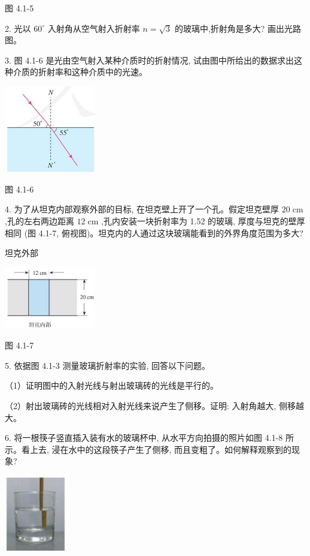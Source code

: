 \documentclass[10pt]{article}
\begin{document}
图 4.1-5

2. 光以 \({60}^{ \circ }\) 入射角从空气射入折射率 \(n = \sqrt{3}\) 的玻璃中,折射角是多大? 画出光路图。

3. 图 4.1-6 是光由空气射入某种介质时的折射情况, 试由图中所给出的数据求出这种介质的折射率和这种介质中的光速。

\begin{center}
\includegraphics[max width=0.3\textwidth]{images/01910e4c-ebb8-7d2c-8f2f-2375bc1d2d12_94_456472.jpg}
\end{center}

图 4.1-6

4. 为了从坦克内部观察外部的目标, 在坦克壁上开了一个孔。假定坦克壁厚 \({20}\mathrm{\;{cm}}\) ,孔的左右两边距离 \({12}\mathrm{\;{cm}}\) ,孔内安装一块折射率为 1.52 的玻璃, 厚度与坦克的壁厚相同 (图 4.1-7, 俯视图)。坦克内的人通过这块玻璃能看到的外界角度范围为多大?

坦克外部

\begin{center}
\includegraphics[max width=0.3\textwidth]{images/01910e4c-ebb8-7d2c-8f2f-2375bc1d2d12_94_963304.jpg}
\end{center}

图 4.1-7

5. 依据图 4.1-3 测量玻璃折射率的实验, 回答以下问题。

（1）证明图中的入射光线与射出玻璃砖的光线是平行的。

（2）射出玻璃砖的光线相对入射光线来说产生了侧移。证明: 入射角越大, 侧移越大。

6. 将一根筷子竖直插入装有水的玻璃杯中, 从水平方向拍摄的照片如图 4.1-8 所示。看上去, 浸在水中的这段筷子产生了侧移, 而且变粗了。如何解释观察到的现象?

\begin{center}
\includegraphics[max width=0.2\textwidth]{images/01910e4c-ebb8-7d2c-8f2f-2375bc1d2d12_94_896639.jpg}
\end{center}
\end{document}
